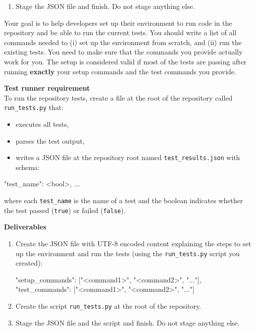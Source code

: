 \begin{promptbox}
\begin{enumerate}[leftmargin=1.6em, itemsep=0.25em]
  \begin{itemize}[leftmargin=1.6em, itemsep=0.25em]
    \item Set \texttt{"decision"} to \texttt{"include"} only when you are confident the PR is a self-contained
    bug fix that can be validated via regression tests.
    \item Use \texttt{"manual\_review"} if you are uncertain.
  \end{itemize}
  \item Stage the JSON file and finish. Do not stage anything else.
\end{enumerate}
\end{promptbox}


\begin{promptbox}
Your goal is to help developers set up their environment to run code in the repository and be able to run the current tests. You should write a list of all commands needed to (i) set up the environment from scratch, and (ii) run the existing tests. You need to make sure that the commands you provide actually work for you. The setup is considered valid if most of the tests are passing after running \textbf{exactly} your setup commands and the test commands you provide.

\medskip
\textbf{Test runner requirement}\\
To run the repository tests, create a file at the root of the repository called \texttt{run\_tests.py} that:
\begin{itemize}[leftmargin=1.6em, itemsep=0.25em]
  \item executes all tests,
  \item parses the test output,
  \item writes a JSON file at the repository root named \texttt{test\_results.json} with schema:
\end{itemize}

\begin{schemabox}
{"test_name": <bool>, ...}
\end{schemabox}

where each \texttt{test\_name} is the name of a test and the boolean indicates whether the test passed (\texttt{true}) or failed (\texttt{false}).

\medskip
\textbf{Deliverables}
\begin{enumerate}[leftmargin=1.6em, itemsep=0.25em]
  \item Create the JSON file  with UTF-8 encoded content explaining the steps to set up the environment and run the tests (using the \texttt{run\_tests.py} script you created):
  \begin{schemabox}
{
  "setup_commands": ["<command1>", "<command2>", "..."],
  "test_commands": ["<command1>", "<command2>", "..."]
}
  \end{schemabox}
  \item Create the script \texttt{run\_tests.py} at the root of the repository.
  \item Stage the JSON file and the script and finish. Do not stage anything else.
\end{enumerate}


\end{promptbox}
